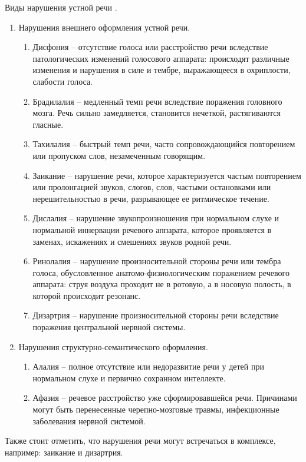 Виды нарушения устной речи \cite{narush}.
\begin{enumerate}
	\item Нарушения внешнего оформления устной речи.
	\begin{enumerate}
		\item Дисфония -- отсутствие голоса или расстройство речи вследствие патологических изменений голосового аппарата: происходят различные изменения и нарушения в силе и тембре, выражающееся в охриплости, слабости голоса.
		\item Брадилалия -- медленный темп речи вследствие поражения головного мозга. Речь сильно замедляется, становится нечеткой, растягиваются гласные.
		\item Тахилалия -- быстрый темп речи, часто сопровождающийся повторением или пропуском слов, незамеченным говорящим. 
		\item Заикание -- нарушение речи, которое характеризуется частым повторением или пролонгацией звуков, слогов, слов, частыми остановками или нерешительностью в речи, разрывающее ее ритмическое течение.
		\item Дислалия -- нарушение звукопроизношения при нормальном слухе и нормальной иннервации речевого аппарата, которое проявляется в заменах, искажениях и смешениях звуков родной речи.
		\item Ринолалия -- нарушение произносительной стороны речи или тембра голоса, обусловленное анатомо-физиологическим поражением речевого аппарата: струя воздуха проходит не в ротовую, а в носовую полость, в которой происходит резонанс.
		\item Дизартрия -- нарушение произносительной стороны речи вследствие поражения центральной нервной системы. 
	\end{enumerate}
	\item Нарушения структурно-семантического оформления.
	\begin{enumerate}
		\item Алалия -- полное отсутствие или недоразвитие речи у детей при нормальном слухе и первично сохранном интеллекте.
		\item Афазия -- речевое расстройство уже сформировавшейся речи. Причинами могут быть перенесенные черепно-мозговые травмы, инфекционные заболевания нервной системой.
	\end{enumerate}
\end{enumerate}

Также стоит отметить, что нарушения речи могут встречаться в комплексе, например: заикание и дизартрия.

